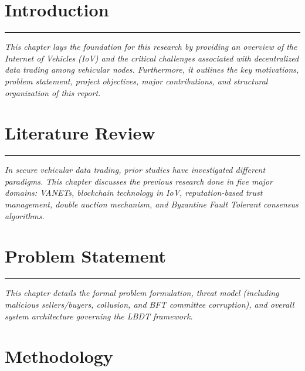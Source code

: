 \documentclass[12pt,phd,times]{pkmthesis}
\begin{document}
\chapter{Introduction}
\vspace{-1cm}

\noindent \rule{\textwidth}{0.01in}
\emph{This chapter lays the foundation for this research by providing an overview of the Internet of Vehicles (IoV) and the critical challenges associated with decentralized data trading among vehicular nodes. Furthermore, it outlines the key motivations, problem statement, project objectives, major contributions, and structural organization of this report.}
\label{chap:intro}
\chapter{Literature Review}
\vspace{-1cm}
\noindent \rule{\textwidth}{0.01in}
\emph{In secure vehicular data trading, prior studies have investigated different paradigms. This chapter discusses the previous research done in five major domains: VANETs, blockchain technology in IoV, reputation-based trust management, double auction mechanism, and Byzantine Fault Tolerant consensus algorithms.}
\label{chap:L_survey}

\chapter{Problem Statement}
\vspace{-1cm}
\noindent \rule{\textwidth}{0.01in}
\emph{This chapter details the formal problem formulation, threat model (including malicious sellers/buyers, collusion, and BFT committee corruption), and overall system architecture governing the LBDT framework.}
\label{chap:problem_statement}



\chapter{Methodology}
\vspace{-1cm}
\end{document}
